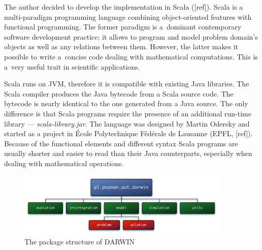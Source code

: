 The author decided to develop the implementation in Scala ([ref]). Scala is a
multi-paradigm programming language combining object-oriented features with
functional programming. The former paradigm is a~dominant contemporary
software development practice; it allows to program and model problem domain's
objects as well as any relations between them. However, the latter makes it
possible to write a~concise code dealing with mathematical computations. This
is a~very useful trait in scientific applications.

Scala runs on JVM, therefore it is compatible with existing Java
libraries. The Scala compiler produces the Java bytecode from a Scala source
code. The bytecode is nearly identical to the one generated from a Java
source. The only difference is that Scala programs require the presence of an
additional run-time library --- \textit{scala-library.jar}. The language was
designed by Martin Odersky and started as a project in École Polytechnique
Fédérale de Lausanne (EPFL, [ref]). Because of the functional elements and
different syntax Scala programs are usually shorter and easier to read than
their Java counterparts, especially when dealing with mathematical operations.

\begin{figure}
  \centering \includegraphics[width=0.9\textwidth]{img/packages}
  \caption{The package structure of DARWIN}
  \label{packages}
\end{figure}

